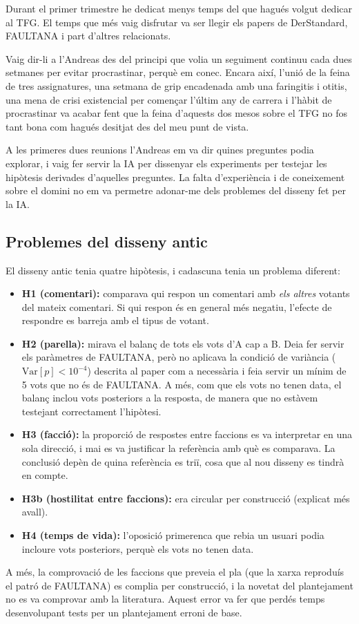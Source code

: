 \documentclass[11pt,a4paper]{article}
\begin{document}
Durant el primer trimestre he dedicat menys temps del que hagués volgut dedicar al TFG. El temps que més vaig disfrutar va ser llegir els papers de DerStandard, FAULTANA i part d'altres relacionats.

Vaig dir-li a l'Andreas des del principi que volia un seguiment continuu cada dues setmanes per evitar procrastinar, perquè em conec. Encara així, l'unió de la feina de tres assignatures, una setmana de grip encadenada amb una faringitis i otitis, una mena de crisi existencial per començar l'últim any de carrera i l'hàbit de procrastinar va acabar fent que la feina d'aquests dos mesos sobre el TFG no fos tant bona com hagués desitjat des del meu punt de vista.

A les primeres dues reunions l'Andreas em va dir quines preguntes podia explorar, i vaig fer servir la IA per dissenyar els experiments per testejar les hipòtesis derivades d'aquelles preguntes. La falta d'experiència i de coneixement sobre el domini no em va permetre adonar-me dels problemes del disseny fet per la IA.

\subsection{Problemes del disseny antic}

El disseny antic tenia quatre hipòtesis, i cadascuna tenia un problema diferent:
\begin{itemize}
  \item \textbf{H1 (comentari):} comparava qui respon un comentari amb \emph{els altres} votants del mateix comentari. Si qui respon és en general més negatiu, l'efecte de respondre es barreja amb el tipus de votant.
  \item \textbf{H2 (parella):} mirava el balanç de tots els vots d'A cap a B. Deia fer servir els paràmetres de FAULTANA, però no aplicava la condició de variància ($\mathrm{Var}[p] < 10^{-4}$) descrita al paper com a necessària i feia servir un mínim de 5 vots que no és de FAULTANA. A més, com que els vots no tenen data, el balanç inclou vots posteriors a la resposta, de manera que no estàvem testejant correctament l'hipòtesi.
  \item \textbf{H3 (facció):} la proporció de respostes entre faccions es va interpretar en una sola direcció, i mai es va justificar la referència amb què es comparava. La conclusió depèn de quina referència es triï, cosa que al nou disseny es tindrà en compte.
  \item \textbf{H3b (hostilitat entre faccions):} era circular per construcció (explicat més avall).
  \item \textbf{H4 (temps de vida):} l'oposició primerenca que rebia un usuari podia incloure vots posteriors, perquè els vots no tenen data.
\end{itemize}
A més, la comprovació de les faccions que preveia el pla (que la xarxa reproduís el patró de FAULTANA) es complia per construcció, i la novetat del plantejament no es va comprovar amb la literatura. Aquest error va fer que perdés temps desenvolupant tests per un plantejament erroni de base.
\end{document}
